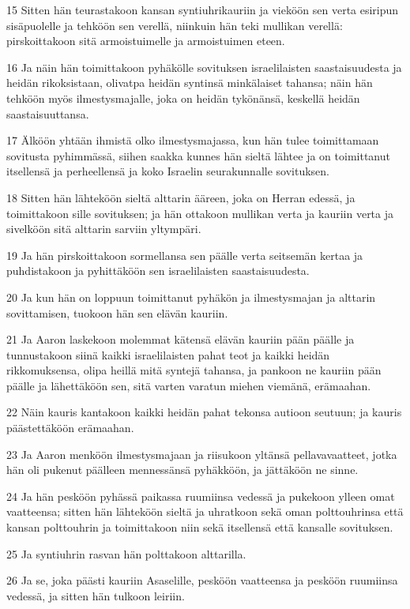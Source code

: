 \par 15 Sitten hän teurastakoon kansan syntiuhrikauriin ja vieköön sen verta esiripun sisäpuolelle ja tehköön sen verellä, niinkuin hän teki mullikan verellä: pirskoittakoon sitä armoistuimelle ja armoistuimen eteen.
\par 16 Ja näin hän toimittakoon pyhäkölle sovituksen israelilaisten saastaisuudesta ja heidän rikoksistaan, olivatpa heidän syntinsä minkälaiset tahansa; näin hän tehköön myös ilmestysmajalle, joka on heidän tykönänsä, keskellä heidän saastaisuuttansa.
\par 17 Älköön yhtään ihmistä olko ilmestysmajassa, kun hän tulee toimittamaan sovitusta pyhimmässä, siihen saakka kunnes hän sieltä lähtee ja on toimittanut itsellensä ja perheellensä ja koko Israelin seurakunnalle sovituksen.
\par 18 Sitten hän lähteköön sieltä alttarin ääreen, joka on Herran edessä, ja toimittakoon sille sovituksen; ja hän ottakoon mullikan verta ja kauriin verta ja sivelköön sitä alttarin sarviin yltympäri.
\par 19 Ja hän pirskoittakoon sormellansa sen päälle verta seitsemän kertaa ja puhdistakoon ja pyhittäköön sen israelilaisten saastaisuudesta.
\par 20 Ja kun hän on loppuun toimittanut pyhäkön ja ilmestysmajan ja alttarin sovittamisen, tuokoon hän sen elävän kauriin.
\par 21 Ja Aaron laskekoon molemmat kätensä elävän kauriin pään päälle ja tunnustakoon siinä kaikki israelilaisten pahat teot ja kaikki heidän rikkomuksensa, olipa heillä mitä syntejä tahansa, ja pankoon ne kauriin pään päälle ja lähettäköön sen, sitä varten varatun miehen viemänä, erämaahan.
\par 22 Näin kauris kantakoon kaikki heidän pahat tekonsa autioon seutuun; ja kauris päästettäköön erämaahan.
\par 23 Ja Aaron menköön ilmestysmajaan ja riisukoon yltänsä pellavavaatteet, jotka hän oli pukenut päälleen mennessänsä pyhäkköön, ja jättäköön ne sinne.
\par 24 Ja hän pesköön pyhässä paikassa ruumiinsa vedessä ja pukekoon ylleen omat vaatteensa; sitten hän lähteköön sieltä ja uhratkoon sekä oman polttouhrinsa että kansan polttouhrin ja toimittakoon niin sekä itsellensä että kansalle sovituksen.
\par 25 Ja syntiuhrin rasvan hän polttakoon alttarilla.
\par 26 Ja se, joka päästi kauriin Asaselille, pesköön vaatteensa ja pesköön ruumiinsa vedessä, ja sitten hän tulkoon leiriin.
